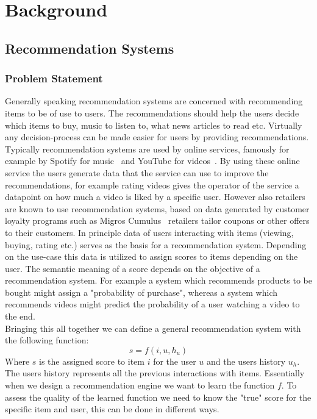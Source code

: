 \chapter{Background}

\section{Recommendation Systems}
\subsection{Problem Statement}
Generally speaking recommendation systems are concerned with recommending items to be of use to users.
The recommendations should help the users decide which items to buy, music to listen to, what news articles to read etc.
Virtually any decision-process can be made easier for users by providing recommendations.
Typically recommendation systems are used by online services, famously for example by Spotify for music~\cite{rec_spotify} and YouTube for videos~\cite{rec_yt}.
By using these online service the users generate data that the service can use to improve the recommendations, for example rating videos gives the operator of the service a datapoint on how much a video is liked by a specific user.
However also retailers are known to use recommendation systems, based on data generated by customer loyalty programs such as Migros Cumulus~\cite{rec_migros} retailers tailor coupons or other offers to their customers.
In principle data of users interacting with items (viewing, buying, rating etc.) serves as the basis for a recommendation system. 
Depending on the use-case this data is utilized to assign scores to items depending on the user. 
The semantic meaning of a score depends on the objective of a recommendation system.
For example a system which recommends products to be bought might assign a "probability of purchase", whereas a system which recommends videos might predict the probability of a user watching a video to the end. 
\\
Bringing this all together we can define a general recommendation system with the following function:
\[
    s = f(i, u, h_u)
\]
Where $s$ is the assigned score to item $i$ for the user $u$ and the users history $u_h$. 
The users history represents all the previous interactions with items.
Essentially when we design a recommendation engine we want to learn the function $f$.
To assess the quality of the learned function we need to know the "true" score for the specific item and user, this can be done in different ways.
